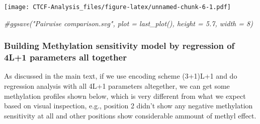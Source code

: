 \documentclass[
]{article}
\newenvironment{Shaded}{\begin{snugshade}}{\end{snugshade}}
\newcommand{\CommentTok}[1]{\textcolor[rgb]{0.56,0.35,0.01}{\textit{#1}}}
\begin{document}
\texttt{[image: CTCF-Analysis\_files/figure-latex/unnamed-chunk-6-1.pdf]}

\begin{Shaded}
\begin{Highlighting}[]
\CommentTok{\#ggsave("Pairwise comparison.svg", plot = last\_plot(), height = 5.7, width = 8)}
\end{Highlighting}
\end{Shaded}

\hypertarget{building-methylation-sensitivity-model-by-regression-of-4l1-parameters-all-together}{%
\subsubsection{Building Methylation sensitivity model by regression of
4L+1 parameters all
together}\label{building-methylation-sensitivity-model-by-regression-of-4l1-parameters-all-together}}

As discussed in the main text, if we use encoding scheme (3+1)L+1 and do
regression analysis with all 4L+1 parameters altegether, we can get some
methylation profiles shown below, which is very different from what we
expect based on visual inspection, e.g., position 2 didn't show any
negative methylation sensitivity at all and other positions show
considerable ammount of methyl effect.
\end{document}

